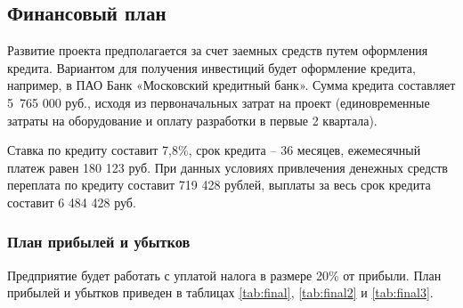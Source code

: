 \documentclass[../main]{subfiles}
\begin{document}
\subsection{Финансовый план}

Развитие проекта предполагается за счет заемных средств путем оформления кредита. Вариантом для получения инвестиций будет оформление кредита, например, в ПАО Банк «Московский кредитный банк». Сумма кредита составляет 5 765 000 руб., исходя из первоначальных затрат на проект (единовременные затраты на оборудование и оплату разработки в первые 2 квартала).

Ставка по кредиту составит 7,8\%, срок кредита -- 36 месяцев, ежемесячный платеж равен 180 123 руб. При данных условиях привлечения денежных средств переплата по кредиту составит 719 428 рублей, выплаты за весь срок кредита составит 6 484 428 руб. 

\subsubsection{План прибылей и убытков}
Предприятие будет работать с уплатой налога в размере 20\% от прибыли. План прибылей и убытков приведен в таблицах \ref{tab:final}, \ref{tab:final2} и \ref{tab:final3}.
\end{document}
